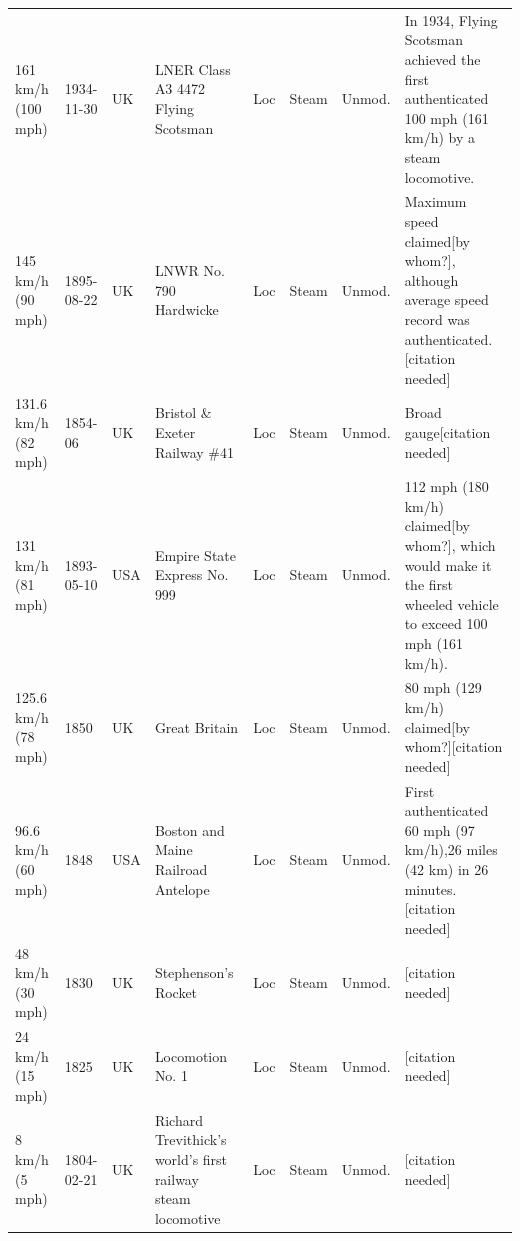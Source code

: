 \documentclass{article}
\begin{document}
\begin{tabular}{llllllll}
161 km/h (100 mph) & 1934-11-30 & UK & LNER Class A3 4472 Flying Scotsman & Loc & Steam & Unmod. & In 1934, Flying Scotsman achieved the first authenticated 100 mph (161 km/h) by a steam locomotive. \\
145 km/h (90 mph) & 1895-08-22 & UK & LNWR No. 790 Hardwicke & Loc & Steam & Unmod. & Maximum speed claimed[by whom?], although average speed record was authenticated.[citation needed] \\
131.6 km/h (82 mph) & 1854-06 & UK & Bristol \& Exeter Railway \#41 & Loc & Steam & Unmod. & Broad gauge[citation needed] \\
131 km/h (81 mph) & 1893-05-10 & USA & Empire State Express No. 999 & Loc & Steam & Unmod. & 112 mph (180 km/h) claimed[by whom?], which would make it the first wheeled vehicle to exceed 100 mph (161 km/h). \\
125.6 km/h (78 mph) & 1850 & UK & Great Britain & Loc & Steam & Unmod. & 80 mph (129 km/h) claimed[by whom?][citation needed] \\
96.6 km/h (60 mph) & 1848 & USA & Boston and Maine Railroad Antelope & Loc & Steam & Unmod. & First authenticated 60 mph (97 km/h),26 miles (42 km) in 26 minutes.[citation needed] \\
48 km/h (30 mph) & 1830 & UK & Stephenson's Rocket & Loc & Steam & Unmod. & [citation needed] \\
24 km/h (15 mph) & 1825 & UK & Locomotion No. 1 & Loc & Steam & Unmod. & [citation needed] \\
8 km/h (5 mph) & 1804-02-21 & UK & Richard Trevithick's world's first railway steam locomotive & Loc & Steam & Unmod. & [citation needed] \\
\bottomrule
\end{tabular}
\end{document}
